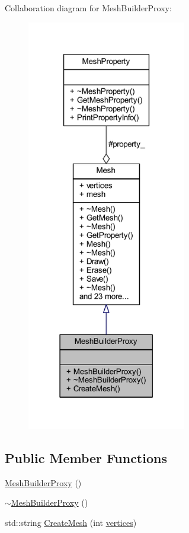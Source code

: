 Collaboration diagram for Mesh\+Builder\+Proxy\+:
\nopagebreak
\begin{figure}[H]
\begin{center}
\leavevmode
\includegraphics[width=197pt]{class_mesh_builder_proxy__coll__graph}
\end{center}
\end{figure}
\subsection*{Public Member Functions}
\begin{DoxyCompactItemize}
\item 
\mbox{\hyperlink{class_mesh_builder_proxy_a4401f9a56170b3d4e5efca1f4d689be0}{Mesh\+Builder\+Proxy}} ()
\item 
\mbox{\hyperlink{class_mesh_builder_proxy_abc3f41500a0dd22d857ad9f380969fd6}{$\sim$\+Mesh\+Builder\+Proxy}} ()
\item 
std\+::string \mbox{\hyperlink{class_mesh_builder_proxy_aeef3c361967a22015c6bd314e3b473e7}{Create\+Mesh}} (int \mbox{\hyperlink{class_mesh_a922390e7245b484961cf4f6e9e37c9dd}{vertices}})
\end{DoxyCompactItemize}
